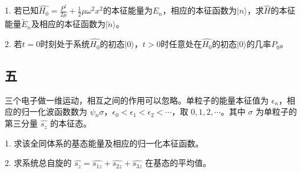 1. 若已知$\hat{H_0} = \frac{P^2}{2\mu} + \frac{1}{2}\mu \omega^2 x^2$的本征能量为$E_n$，相应的本征函数为$|n\rangle$，求$\hat{H}$的本征能量$\tilde {E}_n$及相应的本征函数为$|\tilde n\rangle$。


2. 若$t=0$时刻处于系统$\hat{H_0}$的初态$|0\rangle$，$t>0$时任意处在$\hat{H_0}$的初态$|0\rangle$的几率$P_0$。

\subsection{五}
三个电子做一维运动，相互之间的作用可以忽略。单粒子的能量本征值为 $\epsilon_n$，相应的归一化波函数数为 $\psi{_n\sigma}$，$\epsilon_0 < \epsilon_1 < \epsilon_2 < \cdots$，取 $0, 1, 2, \cdots$。其中 $\sigma$ 为单粒子的第三分量 $\hat{s_z}$ 的本征态。

1. 求该全同体系的基态能量及相应的归一化本征函数。

2. 求系统总自旋的 $\hat{s_z} = \hat{s_{1z}} + \hat{s_{2z}} +\hat{s_{3z}}$ 在基态的平均值。